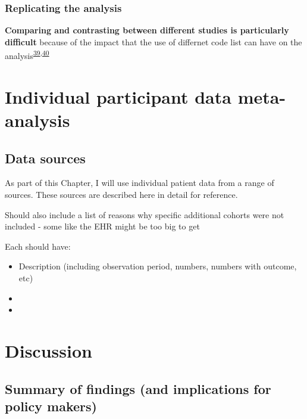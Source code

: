 \documentclass[a4paper, twoside]{templates/ociamthesis}
\begin{document}
\hypertarget{replicating-the-analysis}{%
\subsection{Replicating the analysis}\label{replicating-the-analysis}}

\textbf{Comparing and contrasting between different studies is particularly difficult} because of the impact that the use of differnet code list can have on the analysis\textsuperscript{\protect\hyperlink{ref-wilkinson2018a}{39},\protect\hyperlink{ref-mcguinness2019c}{40}}

\hypertarget{ipd-heading}{%
\chapter{Individual participant data meta-analysis}\label{ipd-heading}}

\minitoc 

\hypertarget{data-sources}{%
\section{Data sources}\label{data-sources}}

As part of this Chapter, I will use individual patient data from a range of sources. These sources are described here in detail for reference.

Should also include a list of reasons why specific additional cohorts were not included - some like the EHR might be too big to get

Each should have:

\begin{itemize}
\item
  Description (including observation period, numbers, numbers with outcome, etc)
\item
\item
\end{itemize}

\hypertarget{discussion-heading}{%
\chapter{Discussion}\label{discussion-heading}}

\hypertarget{summary-of-findings-and-implications-for-policy-makers}{%
\section{Summary of findings (and implications for policy makers)}\label{summary-of-findings-and-implications-for-policy-makers}}
\end{document}
